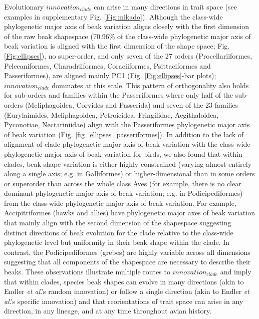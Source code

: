 \documentclass[12pt,letterpaper]{article}
\begin{document}
Evolutionary $innovation_{clade}$ can arise in many directions in trait space (see examples in supplementary Fig. \ref{Fig:mikado}). %
Although the class-wide phylogenetic major axis of beak variation aligns closely with the first dimension of the raw beak shapespace (70.96\% of the class-wide phylogenetic major axis of beak variation is aligned with the first dimension of the shape space; Fig. \ref{Fig:ellipses}), no super-order, and only seven of the 27 orders (Procellariiformes, Pelecaniformes, Charadriiformes, Coraciiformes, Psittaciformes and Passeriformes), are aligned mainly PC1 (Fig. \ref{Fig:ellipses}-bar plots); $innovation_{clade}$ dominates at this scale.
This pattern of orthogonality also holds for sub-orders and families within the Passeriformes where only half of the sub-orders (Meliphagoidea, Corvides and Passerida) and seven of the 23 families (Eurylaimides, Meliphagoidea, Petroicidea, Fringilidae, Aegithaloidea, Pyconotiae, Nectariniidae) align with the Passeriformes phylogenetic major axis of beak variation (Fig.
\ref{fig_ellipses_passeriformes}).
In addition to the lack of alignment of clade phylogenetic major axis of beak variation with the class-wide phylogenetic major axis of beak variation for birds, we also found that within clades, beak shape variation is either highly constrained (varying almost entirely along a single axis; e.g. in Galliformes) or higher-dimensional than in some orders or superorder than across the whole class Aves (for example, there is no clear dominant phylogenetic major axis of beak variation; e.g. in Podicipediformes) from the class-wide phylogenetic major axis of beak variation. %
For example, Accipitriformes (hawks and allies) have phylogenetic major axes of beak variation that mainly align with the second dimension of the shapespace suggesting distinct directions of beak evolution for the clade relative to the class-wide phylogenetic level but uniformity in their beak shape within the clade.
In contrast, the Podicipediformes (grebes) are highly variable across all dimensions suggesting that all components of the shapespace are necessary to describe their beaks.
These observations illustrate multiple routes to $innovation_{clade}$ and imply that within clades, species beak shapes can evolve in many directions (akin to Endler \textit{et al}.'s \cite{endler2005animal} random innovation) or follow a single direction (akin to Endler \textit{et al}.'s \cite{endler2005animal} specific innovation) and that reorientations of trait space can arise in any direction, in any lineage, and at any time throughout avian history.
\end{document}
